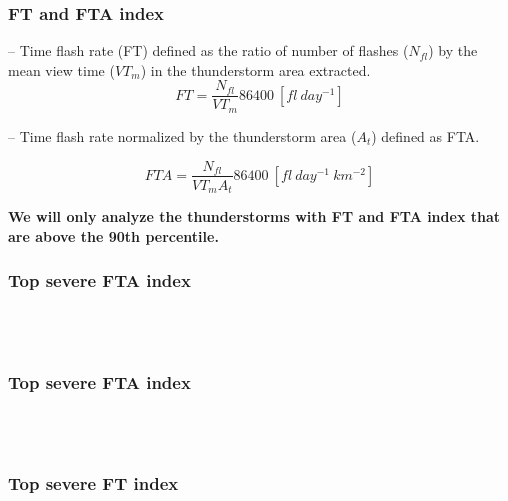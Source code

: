 \documentclass[smaller]{beamer}
\begin{document}
\begin{frame}
\frametitle{}

\end{frame}





\begin{frame}
\frametitle{FT and FTA index}

-- Time flash rate (FT) defined as the ratio of number of flashes ($N_{fl}$) by the mean view time ($VT_m$) in the thunderstorm area extracted.	
\begin{equation}
FT = \frac{N_{fl} }{VT_m} 86400 ~[fl~day^{-1}]    
\end{equation}

-- Time flash rate normalized by the thunderstorm area ($A_t$) defined as FTA. 

\begin{equation}
FTA = \frac{N_{fl} }{VT_m A_t } 86400 ~[fl~day^{-1}~km^{-2}]
\end{equation}

\bigskip
\textbf{We will only analyze the thunderstorms with FT and FTA index that are above the 90th percentile.} 

\end{frame}

\begin{frame}
\frametitle{Top severe FTA index}
~~
\\
\\

\end{frame}


\begin{frame}
\frametitle{Top severe FTA index}
~~
\\
\\

\end{frame}


\begin{frame}
\frametitle{Top severe FT index}

~~
\\
\\

\end{frame}
\end{document}
